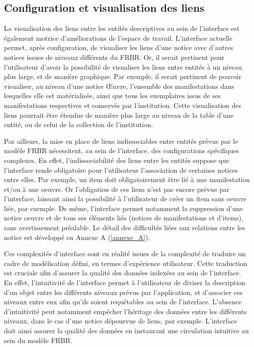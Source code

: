 \subsection{Configuration et visualisation des liens}  

La visualisation des liens entre les entités descriptives au sein de l’interface est également motrice d’améliorations de l’espace de travail. L'interface actuelle permet, après configuration, de visualiser les liens d’une notice avec d’autres notices issues de niveaux différents du \gls{FRBR}. Or, il serait pertinent pour l’utilisateur d’avoir la possibilité de visualiser les liens entre entités à un niveau plus large, et de manière graphique. Par exemple, il serait pertinent de pouvoir visualiser, au niveau d’une notice Œuvre, l'ensemble des manifestations dans lesquelles elle est matérialisée, ainsi que tous les exemplaires issus de ses manifestations respectives et conservés par l’institution. Cette visualisation des liens pourrait être étendue de manière plus large au niveau de la table d’une entité, ou de celui de la collection de l’institution.  

Par ailleurs, la mise en place de liens indissociables entre entités prévus par le modèle \gls{FRBR} nécessitent, au sein de l’interface, des configurations spécifiques complexes. En effet, l’indissociabilité des liens entre les entités suppose que l’interface rende obligatoire pour l’utilisateur l’association de certaines notices entre elles. Par exemple, un \gls{item} doit obligatoirement être lié à une \gls{manifestation} et/ou à une \gls{oeuvre}. Or l’obligation de ces liens n’est pas encore prévue par l’interface, laissant ainsi la possibilité à l’utilisateur de créer un \gls{item} sans \gls{oeuvre} liée, par exemple. De même, l’interface permet notamment la suppression d'une notice \gls{oeuvre} et de tous ses éléments liés (notices de \gls{manifestation}s et d’\gls{item}s), sans avertissement préalable. Le détail des difficultés liées aux relations entre les notice est développé en Annexe A (\ref{annexe_A}).

Ces complexités d’interface sont en réalité issues de la complexité de traduire un cadre de modélisation défini, en termes d’expérience utilisateur. Cette traduction est cruciale afin d’assurer la qualité des données indexées au sein de l’interface. En effet, l’intuitivité de l'interface permet à l'utilisateur de diviser la description d’un objet entre les différents niveaux prévus par l’application, et d’associer ces niveaux entre eux afin qu’ils soient requêtables au sein de l’interface. L’absence d’intuitivité peut notamment empêcher l’héritage des données entre les différents niveaux, dans le cas d’une notice dépourvue de liens, par exemple. L’interface doit ainsi assurer la qualité des données en instaurant une circulation intuitive au sein du modèle \gls{FRBR}. 